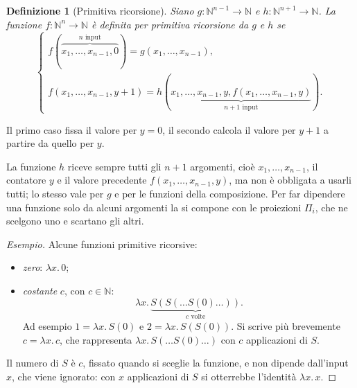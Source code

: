 \documentclass[a4paper, 11pt, oneside]{book}
\theoremstyle{formale}
\newtheorem*{definition}{Definizione}
\newenvironment{esempio}
    {\begin{proof}[\textit{Esempio}]\renewcommand{\qedsymbol}{$\diamond$}}
    {\end{proof}}
\begin{document}
    \begin{definition}[Primitiva ricorsione]
        Siano $g \colon \mathbb{N}^{n-1} \to \mathbb{N}$ e
        $h \colon \mathbb{N}^{n+1} \to \mathbb{N}$. La funzione
        $f \colon \mathbb{N}^n \to \mathbb{N}$ \`e \emph{definita per primitiva
        ricorsione} da $g$ e $h$ se
        \begin{equation*}
            \begin{cases}
                f(\overbrace{x_1, \dots, x_{n-1}, 0}^{n \text{ input}})
                    = g(x_1, \dots, x_{n-1}), \\[4pt]
                f(x_1, \dots, x_{n-1}, y + 1)
                    = h(\underbrace{x_1, \dots, x_{n-1}, y,
                    f(x_1, \dots, x_{n-1}, y)}_{n + 1 \text{ input}}).
            \end{cases}
        \end{equation*}
    \end{definition}

    Il primo caso fissa il valore per $y = 0$, il secondo calcola il valore per $y + 1$
    a partire da quello per $y$.

    La funzione $h$ riceve sempre tutti gli $n + 1$ argomenti, cio\`e
    $x_1, \dots, x_{n-1}$, il contatore $y$ e il valore precedente
    $f(x_1, \dots, x_{n-1}, y)$, ma non \`e obbligata a usarli tutti; lo stesso vale per
    $g$ e per le funzioni della composizione. Per far dipendere una funzione solo da
    alcuni argomenti la si compone con le proiezioni $\Pi_i$, che ne scelgono uno e
    scartano gli altri.

    \begin{esempio}
        Alcune funzioni primitive ricorsive:
        \begin{itemize}
            \item \emph{zero}: $\lambda x.\, 0$;
            \item \emph{costante} $c$, con $c \in \mathbb{N}$:
                \begin{equation*}
                    \lambda x.\, \underbrace{S(S(\dots S(0) \dots))}_{c \text{ volte}}.
                \end{equation*}
                Ad esempio $1 = \lambda x.\, S(0)$ e $2 = \lambda x.\, S(S(0))$. Si scrive
                pi\`u brevemente $c = \lambda x.\, c$, che rappresenta
                $\lambda x.\, S(\dots S(0) \dots)$ con $c$ applicazioni di $S$.
        \end{itemize}
        Il numero di $S$ \`e $c$, fissato quando si sceglie la funzione, e non dipende
        dall'input $x$, che viene ignorato: con $x$ applicazioni di $S$ si otterrebbe
        l'identit\`a $\lambda x.\, x$.
    \end{esempio}
\end{document}
